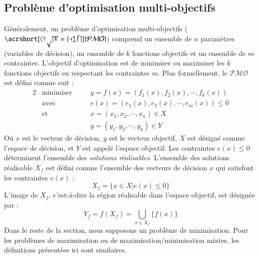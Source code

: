 \subsection{Problème d'optimisation multi-objectifs}
Généralement, un problème d'optimisation multi-objectifs ($\mathcal{\acrshort[hyper=false]{PMO}}$) comprend un ensemble de $n$ paramètres (variables de décision), un ensemble de $k$ fonctions objectifs et un ensemble de $m$ contraintes. L'objectif d'optimisation est de minimiser ou maximiser les $k$ fonctions objectifs en respectant les contraintes $m$. Plus formellement, le $\mathcal{PMO}$ est défini comme suit \cite{Zhou2011} :
\begin{alignat}{2}
& \text{minimiser} \quad && y = f(x) = (f_1(x), f_2(x), \cdots, f_k (x)) \nonumber \\
& \text{avec}      \quad && e(x) = (e_1(x), e_2(x), \cdots, e_m(x)) \leq 0 \nonumber\\
& \text{et}        \quad && x = (x_1, x_2, \cdots , x_n ) \in X \nonumber \\
&                  \quad && y = (y_1, y_2, \cdots , y_k ) \in Y
\end{alignat}
Où $x$ est le vecteur de décision, $y$ est le vecteur objectif, $X$ est désigné comme l'espace de décision, et $Y$ est appelé l'espace objectif. Les contraintes $e(x) \leqslant 0$ déterminent l'ensemble des \textit{solutions réalisables}. L'ensemble des solutions réalisable $X_f$ est défini comme l'ensemble des vecteurs de décision $x$ qui satisfont les contraintes $e(x)$ :
\begin{equation}
 X_f = \{x \in X | e(x) \leqslant 0\}
\end{equation} 
L'image de $X_f$, c'est-à-dire la région réalisable dans l'espace objectif, est désignée par :
\begin{equation}
 Y_f = f(X_f) = \bigcup_{x \in X_f} \{f(x)\}
\end{equation} 
Dans le reste de la section, nous supposons un problème de minimisation. Pour les problèmes de maximisation ou de maximisation/minimisation mixtes, les définitions présentées ici sont similaires.

